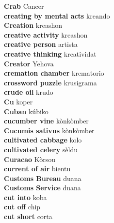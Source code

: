 \textbf{ Crab  } Cancer \\
\textbf{ creating by mental acts  } kreando \\
\textbf{ Creation  } kreashon \\
\textbf{ creative activity  } kreashon \\
\textbf{ creative person  } artista \\
\textbf{ creative thinking  } kreatividat \\
\textbf{ Creator  } Yehova \\
\textbf{ cremation chamber  } krematorio \\
\textbf{ crossword puzzle  } krusigrama \\
\textbf{ crude oil  } krudo \\
\textbf{ Cu  } koper \\
\textbf{ Cuban  } kúbiko \\
\textbf{ cucumber vine  } kònkòmber \\
\textbf{ Cucumis sativus  } kònkòmber \\
\textbf{ cultivated cabbage  } kolo \\
\textbf{ cultivated celery  } sèldu \\
\textbf{ Curacao  } Kòrsou \\
\textbf{ current of air  } bientu \\
\textbf{ Customs Bureau  } duana \\
\textbf{ Customs Service  } duana \\
\textbf{ cut into  } koba \\
\textbf{ cut off  } chip \\
\textbf{ cut short  } corta \\
